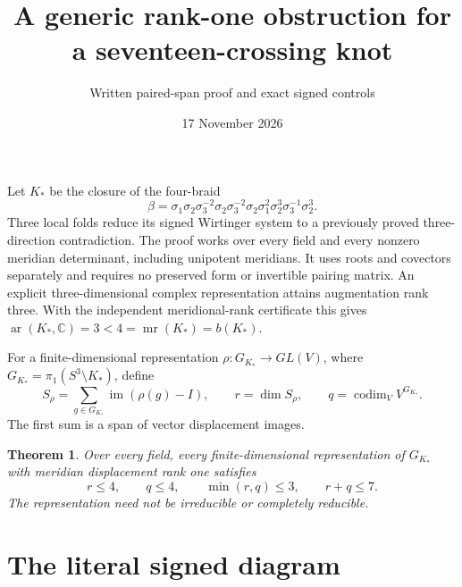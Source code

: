 \documentclass[11pt]{article}
\title{A generic rank-one obstruction for a seventeen-crossing knot}
\author{Written paired-span proof and exact signed controls}
\date{17 November 2026}
\newtheorem{theorem}{Theorem}
\newcommand{\mr}{\operatorname{mr}}
\newcommand{\ar}{\operatorname{ar}}
\newcommand{\C}{\mathbb C}
\begin{document}
\maketitle

Let $K_*$ be the closure of the four-braid
\[
 \beta=\sigma_1\sigma_2\sigma_3^{-2}\sigma_2
 \sigma_3^{-2}\sigma_2\sigma_1^2\sigma_2^3
 \sigma_3^{-1}\sigma_2^3 .
\]
Three local folds reduce its signed Wirtinger system to a previously
proved three-direction contradiction. The proof works over every
field and every nonzero meridian determinant, including unipotent
meridians. It uses roots and covectors separately and requires no
preserved form or invertible pairing matrix.
An explicit three-dimensional complex representation attains
augmentation rank three. With the independent meridional-rank
certificate this gives $\ar(K_*,\C)=3<4=\mr(K_*)=b(K_*)$.

For a finite-dimensional representation $\rho:G_{K_*}\to GL(V)$,
where $G_{K_*}=\pi_1(S^3\setminus K_*)$, define
\[
 S_\rho=\sum_{g\in G_{K_*}}\operatorname{im}(\rho(g)-I),\qquad
 r=\dim S_\rho,\qquad q=\operatorname{codim}_V V^{G_{K_*}}.
\]
The first sum is a span of vector displacement images.

\begin{theorem}\label{thm:pairedspans}
Over every field, every finite-dimensional representation of
$G_{K_*}$ with meridian displacement rank one satisfies
\[
 r\le4,\qquad q\le4,\qquad \min(r,q)\le3,\qquad r+q\le7.
\]
The representation need not be irreducible or completely reducible.
\end{theorem}

\section{The literal signed diagram}
\end{document}
